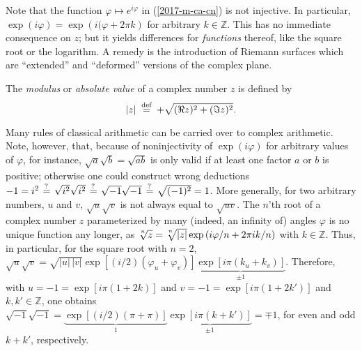 Note that the function $\varphi \mapsto e^{i\varphi}$ in (\ref{2017-m-ca-cn}) is not injective. In particular,
$\exp ({i\varphi})= \exp ( {i(\varphi} + 2\pi  k)$ for arbitrary $k \in \mathbb{Z}$.
This has no immediate consequence on $z$;
but it yields differences for {\em functions} thereof, like the square root or the logarithm.
A remedy is the introduction of Riemann surfaces which are ``extended'' and ``deformed'' versions of the complex plane.

The {\em modulus} or {\em absolute value}
of a complex number $z$ is defined by
\begin{equation}
| z |
\stackrel{{\tiny \textrm{ def }}}{=} +
\sqrt{ (\Re z)^2 + (\Im z)^2 }.
\label{2012-m-ch-ca-defmodulus}
\end{equation}

Many rules of classical arithmetic can be carried over to complex arithmetic.\cite{apostol,freitag-busam}
Note, however,
that, because of noninjectivity of $\exp ( i\varphi)$ for arbitrary values of $\varphi$,
for instance, $\sqrt{a}\sqrt{b}= \sqrt{ab}$
is only valid if at least one factor $a$ or $b$ is positive;
otherwise one could construct wrong deductions $-1=i^2 \stackrel{{\tiny \textrm{ ? }}}{=} \sqrt{i^2}\sqrt{i^2} \stackrel{{\tiny \textrm{ ? }}}{=} \sqrt{-1}\sqrt{-1} \stackrel{{\tiny \textrm{ ? }}}{=} \sqrt{(-1)^2}=1$.
More generally, for two arbitrary numbers, $u$ and $v$,
$\sqrt{u}\sqrt{v}$ is not always equal to $\sqrt{u v}$.
The $n$'th root of a complex number $z$ parameterized by many (indeed, an infinity of) angles $\varphi$ is no unique function any longer,
as $\sqrt[\leftroot{0}\uproot{3}n]{z} = \sqrt[\leftroot{0}\uproot{3}n]{\vert z\vert } \exp \left(i\varphi / n + 2\pi i k/n\right)$
with $k \in \mathbb{Z}$.
Thus, in particular, for the square root with $n=2$,
$\sqrt{u}\sqrt{v}= \sqrt{|u|\,|v|}
\exp \left[ (i/2)(\varphi_u   +\varphi_v )
\right]
\underbrace{\exp \left[i \pi (k_u + k_v)\right]}_{\pm 1}
$.
Therefore, with $u={-1} = \exp [i\pi (1 +2 k)]$ and
$v={-1} = \exp [i\pi (1 +2 k')]$ and $k,k' \in \mathbb{Z}$, one obtains
$
\sqrt{-1}\sqrt{-1}=
\underbrace{\exp \left[ (i/2)(\pi   +\pi )\right]}_{1}
\underbrace{\exp \left[i \pi (k  + k')\right]}_{\pm 1}
=\mp 1
$,
for even and odd $k + k'$, respectively.

